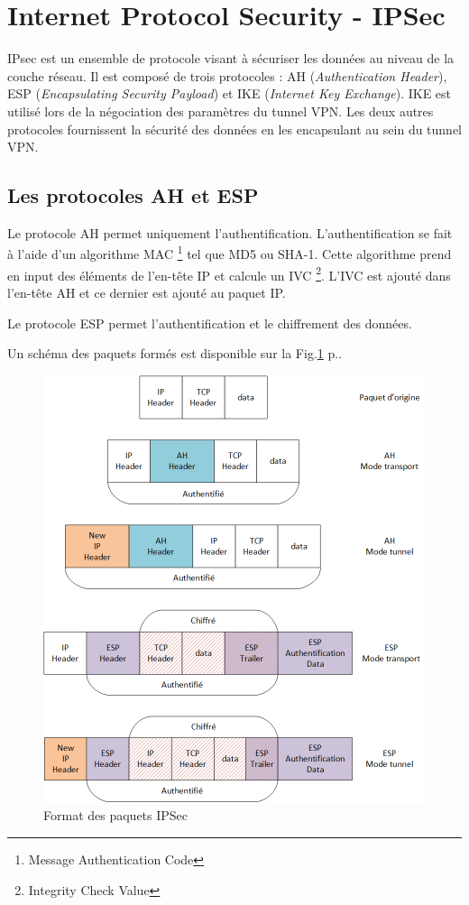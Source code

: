 \section{Internet Protocol Security - IPSec}
IPsec est un ensemble de protocole visant à sécuriser les données au niveau de la couche réseau. 
Il est composé de trois protocoles : AH (\textit{Authentication Header}), ESP (\textit{Encapsulating Security Payload}) et IKE (\textit{Internet Key Exchange}).
IKE est utilisé lors de la négociation des paramètres du tunnel VPN. 
Les deux autres protocoles fournissent la sécurité des données en les encapsulant au sein du tunnel VPN. 

\subsection{Les protocoles AH et ESP}
Le protocole AH permet uniquement l'authentification. 
L'authentification se fait à l'aide d'un algorithme MAC \footnote{Message Authentication Code} tel que MD5 ou SHA-1.
Cette algorithme prend en input des éléments de l'en-tête IP et calcule un IVC \footnote{Integrity Check Value}.
L'IVC est ajouté dans l'en-tête AH et ce dernier est ajouté au paquet IP.

Le protocole ESP permet l'authentification et le chiffrement des données.

Un schéma des paquets formés est disponible sur la Fig.\ref{fig:ipsecHead} p.\pageref{fig:ipsecHead}.

\begin{figure}[ht]
	\centering
	\includegraphics[width=16cm]{techno/IPSec-AH-ESP}
	\caption{Format des paquets IPSec}
	\label{fig:ipsecHead}
\end{figure}

